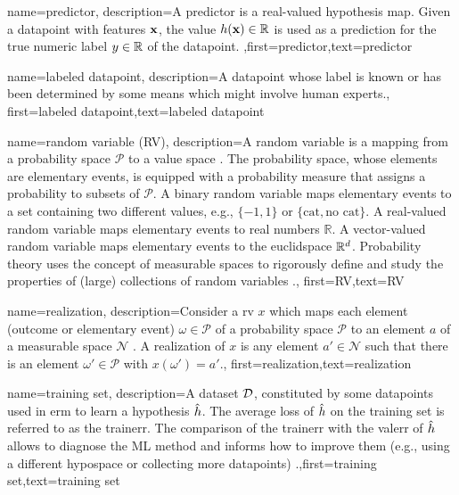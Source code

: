 {name={predictor},
	description={A predictor is a real-valued \gls{hypothesis} map. 
		Given a \gls{datapoint} with \gls{feature}s ${\bf x}$, the value 
		$h({\bf x}) \in \mathbb{R}$ is used as a \gls{prediction} for the true 
		numeric label $y \in \mathbb{R}$ of the \gls{datapoint}. },first={predictor},text={predictor}  
}

{name={labeled datapoint},
 description={A \gls{datapoint} whose \gls{label} is known or has been determined 
 	by some means which might involve human experts.},
 first={labeled datapoint},text={labeled datapoint}  
}

{name={random variable (RV)},
 description={A random 
 		variable is a mapping from a probability space $\mathcal{P}$ to a value space \cite{BillingsleyProbMeasure}. 
 	The probability space, whose elements are elementary events, is equipped with a probability 
 	 measure that assigns a probability to subsets of $\mathcal{P}$. A binary random variable maps elementary events 
 	to a set containing two different values, e.g., $\{-1,1\}$ or $\{ \mbox{cat}, \mbox{no cat} \}$. 
 	A real-valued random variable maps elementary events to real numbers $\mathbb{R}$. 
 	A vector-valued random variable maps elementary events to the \gls{euclidspace} $\mathbb{R}^{d}$. 
 	Probability theory uses the concept of measurable spaces to rigorously define and study the properties of (large) 
 	collections of random variables \cite{GrayProbBook,BillingsleyProbMeasure}.}, first={RV},text={RV}  }
 
	
{name={realization},
	description={Consider a \gls{rv} $x$ which maps each element 
	(outcome or elementary event) $\omega \in \mathcal{P}$ of a probability space $\mathcal{P}$ 
	to an element $a$ of a measurable space $\mathcal{N}$ \cite{BillingsleyProbMeasure,RudinBookPrinciplesMatheAnalysis,HalmosMeasure}. 
	A realization of $x$ is any element $a' \in \mathcal{N}$ such that there is 
	an element $\omega' \in \mathcal{P}$ with $x(\omega') = a'$.}, first={realization},text={realization}  }

{name={training set},
description={A \gls{dataset} $\mathcal{D}$, constituted by some \gls{datapoint}s used in \gls{erm} 
	to learn a \gls{hypothesis} $\hat{h}$. The average \gls{loss} of $\hat{h}$ on the 
	training set is referred to as the \gls{trainerr}. The comparison of the \gls{trainerr} with the 
	\gls{valerr} of $\hat{h}$ allows to diagnose the ML method and informs how to improve 
	them (e.g., using a different \gls{hypospace} or collecting more \gls{datapoint}s) \cite[Sec. 6.6.]{MLBasics}.},first={training set},text={training set}  
}

